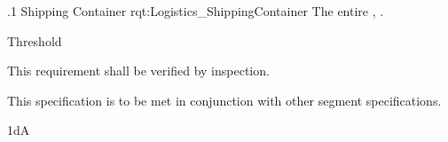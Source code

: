 \ONERQMTV
{\RqtNumberBase.1}
{Shipping Container}
{rqt:Logistics_ShippingContainer}
{The entire \ThisSys, \TBD.}
{
	\item [Phase 1] Threshold
}
{This requirement shall be verified by inspection.}
{
	\item [\cite{ref__BDP_FOS_CDD}] \TBD
}
{
	\item This specification is to be met in conjunction with other segment specifications.
}
{1dA}

